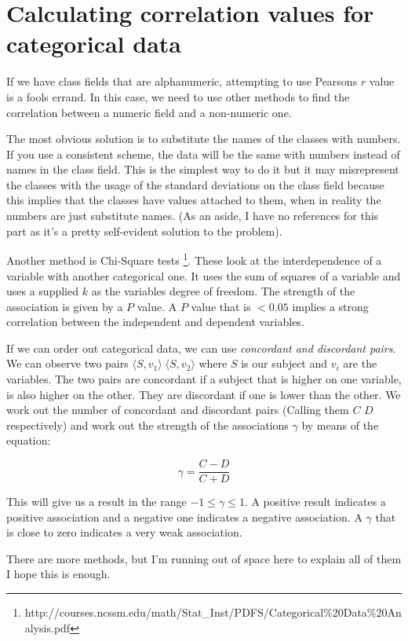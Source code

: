 \documentclass[a4paper,10pt]{article}
\begin{document}
      \section{Calculating correlation values for categorical data}
        If we have class fields that are alphanumeric, attempting to use Pearsons $r$ value is a fools errand.
        In this case, we need to use other methods to find the correlation between a numeric field and a non-numeric
        one. 
 
        The most obvious solution is to substitute the names of the classes with numbers. If you use a consistent
        scheme, the data will be the same with numbers instead of names in the class field. This is the simplest way
        to do it but it may misrepresent the classes with the usage of the standard deviations on the class field
        because this implies that the classes have values attached to them, when in reality the numbers are just
        substitute names. (As an aside, I have no references for this part as it's a pretty self-evident solution
        to the problem).

        Another method is Chi-Square tests \footnote{http://courses.ncssm.edu/math/Stat\_Inst/PDFS/Categorical\%20Data\%20Analysis.pdf}.
         These look at the interdependence of a variable with another
        categorical one. It uses the sum of squares of a variable and uses a supplied $k$ as the variables degree of
        freedom. The strength of the association is given by a $P$ value. A $P$ value that is $<0.05$ implies a strong
        correlation between the independent and dependent variables. 

        If we can order out categorical data, we can use \emph{concordant and discordant pairs}.
        We can observe two pairs $\langle S, v_1 \rangle \; \langle S, v_2 \rangle$ where $S$ is our
        subject and $v_i$ are the variables. The two pairs are concordant if a subject that is higher
        on one variable, is also higher on the other. They are discordant if one is lower than the other.
        We work out the number of concordant and discordant pairs (Calling them $C$ $D$ respectively) and
        work out the strength of the associations $\gamma$ by means of the equation:

        \begin{equation}
           \gamma = \frac{C - D}{C + D}
        \end{equation} 

        This will give us a result in the range $-1 \leq \gamma \leq 1$. A positive result indicates a positive
        association and a negative one indicates a negative association. A $\gamma$ that is close to zero 
        indicates a very weak association. 

        There are more methods, but I'm running out of space here to explain all of them I hope this is enough.  
        
\end{document}
